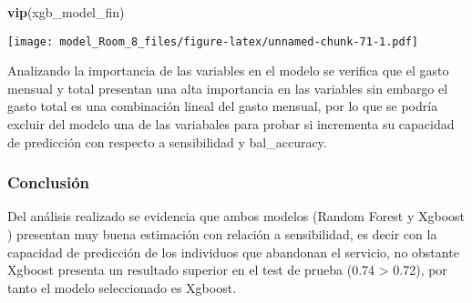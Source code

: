 \documentclass[
]{article}
\newenvironment{Shaded}{\begin{snugshade}}{\end{snugshade}}
\newcommand{\FunctionTok}[1]{\textcolor[rgb]{0.13,0.29,0.53}{\textbf{#1}}}
\newcommand{\NormalTok}[1]{#1}
\begin{document}
\begin{Shaded}
\begin{Highlighting}[]
\FunctionTok{vip}\NormalTok{(xgb\_model\_fin)}
\end{Highlighting}
\end{Shaded}

\texttt{[image: model\_Room\_8\_files/figure-latex/unnamed-chunk-71-1.pdf]}

Analizando la importancia de las variables en el modelo se verifica que
el gasto mensual y total presentan una alta importancia en las variables
sin embargo el gasto total es una combinación lineal del gasto mensual,
por lo que se podría excluir del modelo una de las variabales para
probar si incrementa su capacidad de predicción con respecto a
sensibilidad y bal\_accuracy.

\hypertarget{conclusiuxf3n}{%
\subsubsection{Conclusión}\label{conclusiuxf3n}}

Del análisis realizado se evidencia que ambos modelos (Random Forest y
Xgboost ) presentan muy buena estimación con relación a sensibilidad, es
decir con la capacidad de predicción de los individuos que abandonan el
servicio, no obstante Xgboost presenta un resultado superior en el test
de prueba (0.74 \textgreater{} 0.72), por tanto el modelo seleccionado
es Xgboost.
\end{document}
